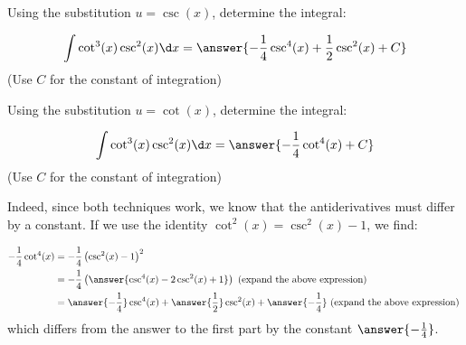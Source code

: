 \documentclass{ximera}
\author{Jason Miller}
\begin{document}
\begin{exercise}
Using the substitution $u= \csc(x)$, determine the integral:

\[
\int \cot^{3}(x) \csc^{2}(x) \d x=\answer{- \frac{1}{4}\csc^{4}(x) + \frac{1}{2}\csc^{2}(x) +C }                  
\]         
(Use $C$ for the constant of integration)

Using the substitution $u= \cot(x)$, determine the integral:

\[
\int \cot^{3}(x) \csc^{2}(x) \d x=\answer{-\frac{1}{4} \cot^4(x) +C }                  
\]         
(Use $C$ for the constant of integration)

\begin{multipleChoice}
\end{multipleChoice}

\begin{exercise}
Indeed, since both techniques work, we know that the antiderivatives must differ by a constant.  If we use the identity $\cot^2(x) = \csc^2(x)-1$, we find:

\begin{align*}
-\frac{1}{4} \cot^4(x) & = -\frac{1}{4} \left(\csc^2(x)-1\right)^2 \\
&= -\frac{1}{4}\left( \answer{\csc^4(x) - 2 \csc^2(x) +1}\right)  \textrm{ (expand the above expression) } \\
&= \answer{-\frac{1}{4}} \csc^4(x) + \answer{\frac{1}{2}} \csc^2(x) +\answer{-\frac{1}{4}}  \textrm{ (expand the above expression) } \\
\end{align*}
which differs from the answer to the first part by the constant $\answer{-\frac{1}{4}}$.

\end{exercise}
\end{exercise}
\end{document}
